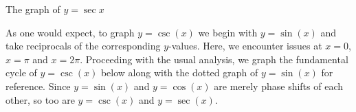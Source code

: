 \bigskip



\noindent\begin{minipage}{\textwidth}
\begin{center}
\end{center}
\captionsetup{type=figure}
\caption{The graph of $y=\sec{x}$}\label{fig:secgraph2}
\end{minipage}

\medskip

As one would expect, to graph $y = \csc(x)$ we begin with $y = \sin(x)$ and take reciprocals of the corresponding $y$-values.  Here, we encounter issues at $x = 0$, $x = \pi$ and $x = 2\pi$.  Proceeding with the usual analysis, we graph the fundamental cycle of $y = \csc(x)$ below along with the dotted graph of $y=\sin(x)$ for reference.  Since $y = \sin(x)$ and $y = \cos(x)$ are merely phase shifts of each other, so too are $y = \csc(x)$ and $y = \sec(x)$. 

\medskip

